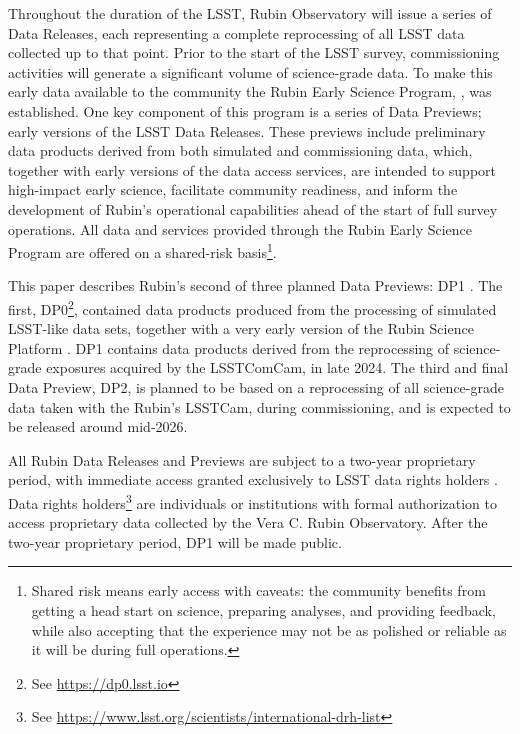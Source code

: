 Throughout the duration of the \gls{LSST},  Rubin Observatory will issue a series of Data Releases, each representing a complete reprocessing of all \gls{LSST} data collected up to that point.
Prior to the start of the \gls{LSST} survey, commissioning activities will generate a significant volume of science-grade data.
To make this early data available to the community the Rubin Early Science Program, \citep{RTN-011}, was established.
One key component of this program is a series of Data Previews; early versions of the \gls{LSST} Data Releases.
These previews include preliminary data products derived from both simulated and commissioning data, which, together with early versions of the data access services, are intended to support high-impact early science, facilitate community readiness, and inform the development of Rubin’s operational capabilities ahead of the start of full survey operations.
All data and services provided through the Rubin Early Science Program are offered on a shared-risk basis\footnote{Shared risk means early access with caveats: the community benefits from getting a head start on science, preparing analyses, and providing feedback, while also accepting that the experience may not be as polished or reliable as it will be during full operations.}.

This paper describes Rubin's second of three planned Data Previews: \gls{DP1} \citep{10.71929/rubin/2570308}.
The first, \gls{DP0}\footnote{See \url{https://dp0.lsst.io}}, contained data products produced from the processing of simulated \gls{LSST}-like data sets, together with a very early version of the Rubin \gls{Science Platform} \citep{LSE-319}.
\gls{DP1} contains data products derived from the reprocessing of science-grade exposures acquired by the \gls{LSSTComCam}, in late 2024.
The third and final Data Preview, \gls{DP2}, is planned to be based on a reprocessing of all science-grade data taken with the Rubin's \gls{LSSTCam}, during commissioning, and is expected to be released around mid-2026.

All Rubin Data Releases and Previews are subject to a two-year proprietary period, with immediate access granted exclusively to LSST data rights holders \citep{rdo-013}.
Data rights holders\footnote{See \url{https://www.lsst.org/scientists/international-drh-list}} are individuals or institutions with formal authorization to access proprietary data collected by the Vera C. Rubin Observatory.
After the two-year proprietary period, \gls{DP1} will be made public.

